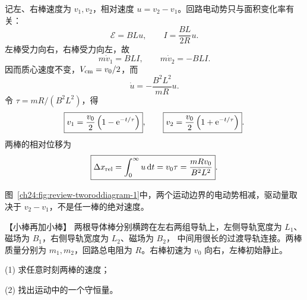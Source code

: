 {\begin{xesolution}
记左、右棒速度为 $v_1,v_2$，相对速度 $u=v_2-v_1$。回路电动势只与面积变化率有关：
\begin{equation}
  \mathcal E=BLu,
  \qquad I=\frac{BL}{2R}u.
\end{equation}
左棒受力向右，右棒受力向左，故
\begin{equation}
  m\dot v_1=BLI,
  \qquad m\dot v_2=-BLI.
\end{equation}
因而质心速度不变，$V_{\rm cm}=v_0/2$，而
\begin{equation}
  \dot u=-\frac{B^2L^2}{mR}u.
\end{equation}
令 $\tau=mR/(B^2L^2)$，得
\begin{equation}
  \boxed{v_1=\frac{v_0}{2}\left(1-\mathrm e^{-t/\tau}\right)},
  \qquad
  \boxed{v_2=\frac{v_0}{2}\left(1+\mathrm e^{-t/\tau}\right)}.
\end{equation}
两棒的相对位移为
\begin{equation}
  \boxed{\Delta x_{\rm rel}=\int_0^\infty u\mathop{}\!\mathrm d t
  =v_0\tau=\frac{mRv_0}{B^2L^2}}.
\end{equation}

图~\ref{ch24:fig:review-tworoddiagram-1}中，两个运动边界的电动势相减，驱动量取决于 $v_2-v_1$，不是任一棒的绝对速度。
\par\noindent\begin{minipage}{\linewidth}
\twoRodDiagram
{}
\end{minipage}\par\medskip
\end{xesolution}



\begin{origexamplebox}{【小棒再加小棒】}\label{ch24:ex:s40-9-5}
两根导体棒分别横跨在左右两组导轨上，左侧导轨宽度为 $L_1$、磁场为 $B_1$，右侧导轨宽度为 $L_2$、磁场为 $B_2$，
中间用很长的过渡导轨连接。两棒质量分别为 $m_1,m_2$，回路总电阻为 $R$。右棒初速为 $v_0$ 向右，左棒初始静止。

(1) 求任意时刻两棒的速度；

(2) 找出运动中的一个守恒量。

%
\begin{center}\end{center}
\end{origexamplebox}

}
